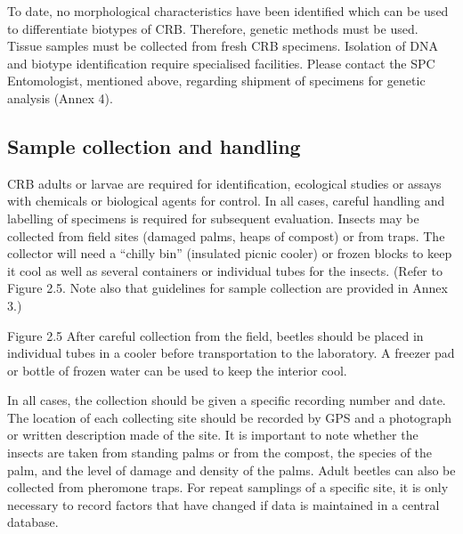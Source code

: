 \documentclass[twocolumn,letterpaper]{scrartcl}
\begin{document}
To date, no morphological characteristics have been identified which can be used to differentiate biotypes of 
CRB. Therefore, genetic methods must be used. Tissue samples must be collected from fresh CRB specimens. 
Isolation of DNA and biotype identification require specialised facilities. Please contact the SPC Entomologist, 
mentioned above, regarding shipment of specimens for genetic analysis (Annex 4). 

\subsection{Sample collection and handling} 

CRB adults or larvae are required for identification, ecological studies or assays with chemicals or biological 
agents for control. In all cases, careful handling and labelling of specimens is required for subsequent evaluation. 
Insects may be collected from field sites (damaged palms, heaps of compost) or from traps. The collector will 
need a “chilly bin” (insulated picnic cooler) or frozen blocks to keep it cool as well as several containers or 
individual tubes for the insects. (Refer to Figure 2.5. Note also that guidelines for sample collection are provided 
in Annex 3.) 

Figure 2.5  After careful collection from the field, beetles should be placed in individual tubes in a cooler before 
transportation to the laboratory. A freezer pad or bottle of frozen water can be used to keep the interior cool.

In all cases, the collection should be given a specific recording number and date. The location of each collecting 
site should be recorded by GPS and a photograph or written description made of the site. It is important to note 
whether the insects are taken from standing palms or from the compost, the species of the palm, and the level 
of damage and density of the palms. Adult beetles can also be collected from pheromone traps. For repeat 
samplings of a specific site, it is only necessary to record factors that have changed if data is maintained in a 
central database.
\end{document}
